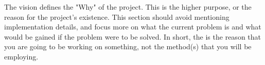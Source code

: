 The vision defines the "Why" of the project. This is the higher purpose, or the reason for the project's existence. This section should avoid mentioning implementation details, and focus more on what the current problem is and what would be gained if the problem were to be solved. In short, the is the reason that you are going to be working on something, not the method(s) that you will be employing.